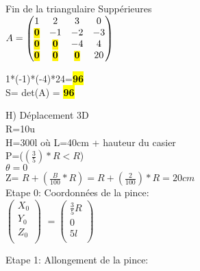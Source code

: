 \vspace{5mm} %
Fin de la triangulaire Suppérieures \\

$
A =
\begin{pmatrix}
  1 & 2 & 3 & 0    \\
  \hl{\textbf{0}} & -1 & -2 & -3 \\
  \hl{\textbf{0}} & \hl{\textbf{0}} & -4 & 4   \\
  \hl{\textbf{0}} & \hl{\textbf{0}} & \hl{\textbf{0}} & 20  \\
\end{pmatrix}
$

\vspace{5mm} %

1*(-1)*(-4)*24=\hl{\textbf{96}} \\
\vspace{4mm} %
S= det(A) = \hl{\textbf{96}} \\


\vspace{15mm} %

H) Déplacement 3D \\

R=10u\\
H=300l où L=40cm + hauteur du casier\\
P=($(\frac{3}{5})* R<R$)\\
$\theta =0$\\
Z= $R+(\frac{B}{100}*R) = R+(\frac{2}{100})*R=20cm $\\

Etape 0: Coordonnées de la pince: \\

$
\begin{pmatrix}
  X_{0} \\
  Y_{0} \\
  Z_{0} \\
\end{pmatrix}
$
\vspace{5mm} %
$
=
\begin{pmatrix}
  \frac{3}{5}R \\
  0 \\
  5l \\
\end{pmatrix}
$

Etape 1: Allongement de la pince: \\

